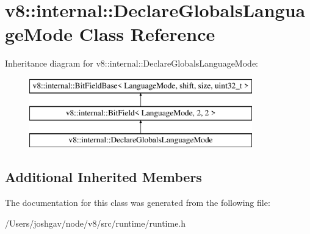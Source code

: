 \hypertarget{classv8_1_1internal_1_1_declare_globals_language_mode}{}\section{v8\+:\+:internal\+:\+:Declare\+Globals\+Language\+Mode Class Reference}
\label{classv8_1_1internal_1_1_declare_globals_language_mode}
Inheritance diagram for v8\+:\+:internal\+:\+:Declare\+Globals\+Language\+Mode\+:\begin{figure}[H]
\begin{center}
\leavevmode
\includegraphics[height=3.000000cm]{classv8_1_1internal_1_1_declare_globals_language_mode}
\end{center}
\end{figure}
\subsection*{Additional Inherited Members}


The documentation for this class was generated from the following file\+:\begin{DoxyCompactItemize}
\item 
/\+Users/joshgav/node/v8/src/runtime/runtime.\+h\end{DoxyCompactItemize}
